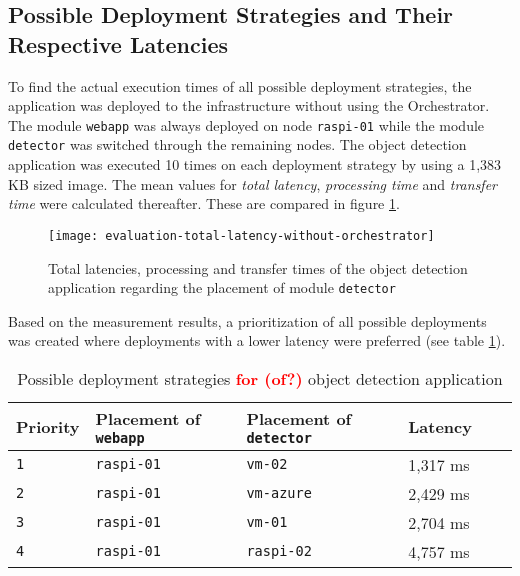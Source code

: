 \subsection{Possible Deployment Strategies and Their Respective Latencies\label{sec:eval-possible-deployments}}
To find the actual execution times of all possible deployment strategies, the application was deployed to the infrastructure without using the Orchestrator.
The module \texttt{webapp} was always deployed on node \texttt{raspi-01} while the module \texttt{detector} was switched through the remaining nodes.
The object detection application was executed 10 times on each deployment strategy by using a 1,383 KB sized image.
The mean values for \textit{total latency}, \textit{processing time} and \textit{transfer time} were calculated thereafter. These are compared in figure \ref{fig:evaluation-total-latency-without-orchestrator}.

\begin{figure}[h!]
    \centering
    \texttt{[image: evaluation-total-latency-without-orchestrator]}
    \caption{Total latencies, processing and transfer times of the object detection application regarding the placement of module \texttt{detector}}
    \label{fig:evaluation-total-latency-without-orchestrator}
\end{figure}

Based on the measurement results, a prioritization of all possible deployments was created where deployments with a lower latency were preferred (see table \ref{tab:deployment-strategies-prios}).
\begin{table}[h!tb]
    \centering
    \begin{tabular}{|l|l|l|l|l|l|}
    \hline
        \textbf{Priority} & \textbf{Placement of \texttt{webapp}} & \textbf{Placement of \texttt{detector}} & \textbf{Latency} \\
         \hline
         \texttt{1} & \texttt{raspi-01} & \texttt{vm-02} & 1,317 ms\\
         \hline
         \texttt{2} & \texttt{raspi-01} & \texttt{vm-azure} & 2,429 ms\\
         \hline
         \texttt{3} & \texttt{raspi-01} & \texttt{vm-01} & 2,704 ms\\
         \hline
         \texttt{4} & \texttt{raspi-01} & \texttt{raspi-02} & 4,757 ms\\
         \hline
    \end{tabular}
    \caption{Possible deployment strategies \textcolor{red}{\textbf{for (of?)}} object detection application}
    \label{tab:deployment-strategies-prios}
\end{table}

